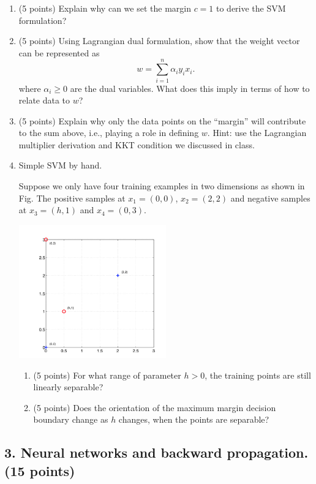 \documentclass[12pt]{article}
\begin{document}
\begin{enumerate}
\item (5 points) Explain why can we set the margin $c = 1$ to derive the SVM formulation?
\item (5 points) Using Lagrangian dual formulation, show that the weight vector can be represented as
\[
w = \sum_{i=1}^n \alpha_i y_i x_i.
\]
where $\alpha_i \geq 0$ are the dual variables. What does this imply in terms of how to relate data to $w$?
\item (5 points) Explain why only the data points on the ``margin'' will contribute to the sum above, i.e., playing a role in defining $w$. Hint: use the Lagrangian multiplier derivation and KKT condition we discussed in class. 

\item Simple SVM by hand. 

Suppose we only have four training examples in two dimensions as shown in Fig. The positive samples at $x_1 = (0, 0)$, $x_2 = (2, 2)$ and negative samples at $x_3 = (h, 1)$ and $x_4 = (0, 3)$. 
%
\begin{center}
\includegraphics[width = 0.5\textwidth]{svm}
\end{center}

\begin{enumerate}
\item (5 points) For what range of parameter $h > 0$, the training points are still linearly separable?



\item (5 points) Does the orientation of the maximum margin decision boundary change as $h$ changes, when the points are separable?
\end{enumerate}


\end{enumerate}


\subsection*{3. Neural networks and backward propagation. (15 points)}
\end{document}
